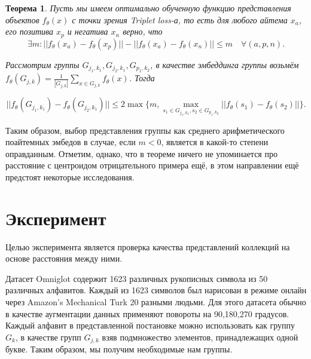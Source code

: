 \documentclass{article}
\newtheorem{theorem}{Теорема}
\begin{document}
\begin{theorem}

    Пусть мы имеем оптимально обученную функцию представления объектов $f_{\theta}(x)$ с точки зрения Triplet loss-а, то есть для любого айтема $x_a$, его позитива $x_p$ и негатива $x_n$ верно, что
    $$
    \exists m : ||f_{\theta}(x_a) - f_{\theta}(x_p)|| - ||f_{\theta}(x_a) - f_{\theta}(x_n)|| \leq m \quad \forall (a, p, n).
    $$

    Рассмотрим группы $G_{j_1, k_1}, G_{j_2, k_1}, G_{p_1, k_2}$, в качестве эмбеддинга группы возьмём $f_{\theta}(G_{j, k}) = \frac{1}{|G_{j, k}|}\sum_{x \in G_{j, k}}f_\theta(x)$. Тогда

    $$
    || f_{\theta}(G_{j_1, k_1}) - f_{\theta}(G_{j_2, k_1}) || \leq 2\max\{m, \max_{s_1 \in G_{j_1, k_1}, s_2 \in G_{p_1, k_2}}{||f_{\theta}(s_1) - f_{\theta}(s_2)||}\}.
    $$

\end{theorem}

Таким образом, выбор представления группы как среднего арифметического поайтемных эмбедов в случае, если $m < 0$, является в какой-то степени оправданным. Отметим, однако, что в теореме ничего не упоминается про расстояние с центроидом отрицательного примера ещё, в этом направлении ещё предстоят некоторые исследования.

\section{Эксперимент}

Целью эксперимента является проверка качества представлений коллекций на основе расстояния между ними.

Датасет Omniglot \cite{doi:10.1126/science.aab3050} содержит 1623 различных рукописных символа из 50 различных алфавитов. Каждый из 1623 символов был нарисован в режиме онлайн через Amazon's Mechanical Turk 20 разными людьми. Для этого датасета обычно в качестве аугментации данных применяют повороты на 90,180,270 градусов.
Каждый алфавит в представленной постановке можно использовать как группу $G_k$, в качестве групп $G_{j, k}$ взяв подмножество элементов, принадлежащих одной букве. Таким образом, мы получим необходимые нам группы.
\end{document}
